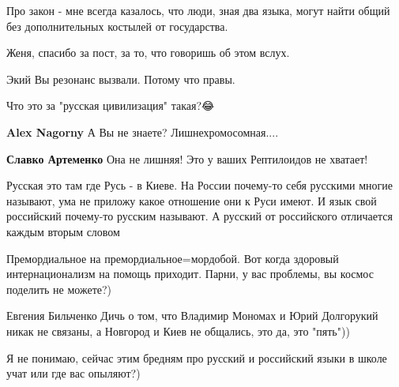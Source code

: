 \begin{itemize}
Про закон - мне всегда казалось, что люди, зная два языка, могут найти общий
без дополнительных костылей от государства.

Женя, спасибо за пост, за то, что говоришь об этом вслух.



Экий Вы резонанс вызвали. Потому что правы.




Что это за "русская цивилизация" такая?😂

\begin{itemize}
\textbf{Alex Nagorny} А Вы не знаете? Лишнехромосомная....


\textbf{Славко Артеменко} Она не лишняя! Это у ваших Рептилоидов не хватает!


Русская это там где Русь - в Киеве. На России почему-то себя русскими многие называют, ума не приложу какое отношение они к Руси имеют. И язык свой российский почему-то русским называют. А русский от российского отличается каждым вторым словом


Премордиальное на премордиальное=мордобой. Вот когда здоровый интернационализм на помощь приходит. Парни, у вас проблемы, вы космос поделить не можете?)

Евгения Бильченко
Дичь о том, что Владимир Мономах и Юрий Долгорукий никак не связаны, а Новгород и Киев не общались, это да, это "пять"))


Я не понимаю, сейчас этим бредням про русский и российский языки в школе учат или где вас опыляют?)



\end{itemize}
\end{itemize}
